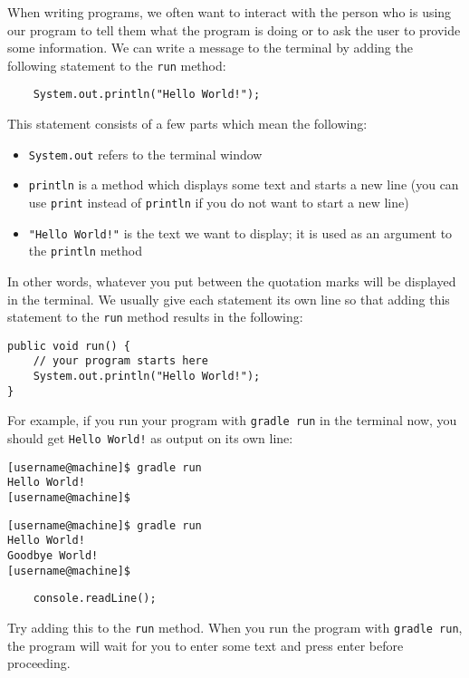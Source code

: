 When writing programs, we often want to interact with the person who is using our program to tell them what the program is doing or to ask the user to provide some information. We can write a message to the terminal by adding the following statement to the \texttt{run} method:
\begin{verbatim}
    System.out.println("Hello World!");
\end{verbatim} 
This statement consists of a few parts which mean the following:
\begin{itemize}
	\item \texttt{System.out} refers to the terminal window
	\item \texttt{println} is a method which displays some text and starts a new line (you can use \texttt{print} instead of \texttt{println} if you do not want to start a new line)
	\item \texttt{"Hello World!"} is the text we want to display; it is used as an argument to the \texttt{println} method
\end{itemize}
In other words, whatever you put between the quotation marks will be displayed in the terminal. We usually give each statement its own line so that adding this statement to the \texttt{run} method results in the following:
\begin{verbatim}
public void run() {
    // your program starts here
    System.out.println("Hello World!");
}
\end{verbatim}
For example, if you run your program with \texttt{gradle run} in the terminal now, you should get \texttt{Hello World!} as output on its own line:
\begin{verbatim}
[username@machine]$ gradle run 
Hello World!
[username@machine]$ 
\end{verbatim}
\taskLine
{}
\begin{verbatim}
[username@machine]$ gradle run 
Hello World!
Goodbye World!
[username@machine]$ 
\end{verbatim}
\taskLine

\begin{verbatim}
    console.readLine();
\end{verbatim}
Try adding this to the \texttt{run} method. When you run the program with \texttt{gradle run}, the program will wait for you to enter some text and press enter before proceeding.
\taskLine 

